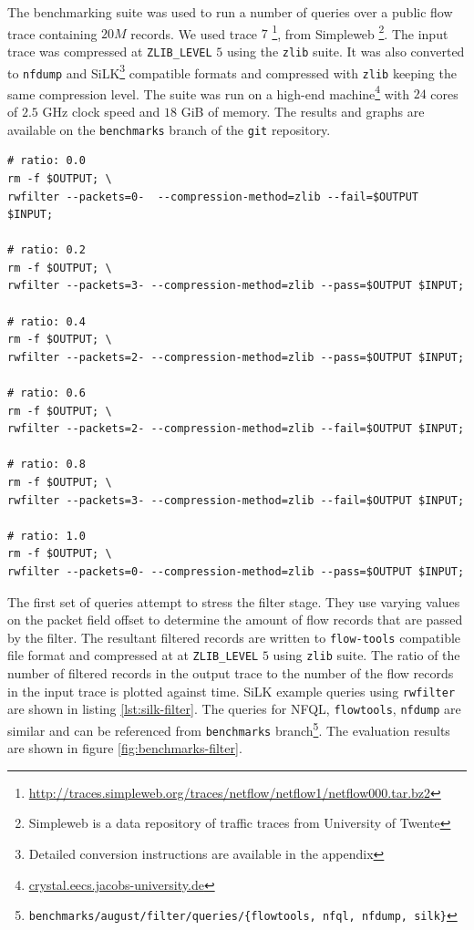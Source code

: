 The benchmarking suite was used to run a number of queries over a public flow
trace containing $20M$ records. We used trace $7$
\footnote{\url{http://traces.simpleweb.org/traces/netflow/netflow1/netflow000.tar.bz2}},
from Simpleweb \footnote{Simpleweb is a data repository of traffic traces from
University of Twente}.  The input trace was compressed at \texttt{ZLIB\_LEVEL}
$5$ using the \texttt{zlib} suite. It was also converted to \texttt{nfdump}
and SiLK\footnote{Detailed conversion instructions are available in the
appendix} \cite{SiLK} compatible formats and compressed with \texttt{zlib}
keeping the same compression level.  The suite was run on a high-end
machine\footnote{\url{crystal.eecs.jacobs-university.de}} with $24$ cores of
$2.5$ GHz clock speed and $18$ GiB of memory. The results and graphs are
available on the \texttt{benchmarks} branch of the \texttt{git} repository.

\begin{lstlisting}
# ratio: 0.0
rm -f $OUTPUT; \
rwfilter --packets=0-  --compression-method=zlib --fail=$OUTPUT $INPUT;

# ratio: 0.2
rm -f $OUTPUT; \
rwfilter --packets=3- --compression-method=zlib --pass=$OUTPUT $INPUT;

# ratio: 0.4
rm -f $OUTPUT; \
rwfilter --packets=2- --compression-method=zlib --pass=$OUTPUT $INPUT;

# ratio: 0.6
rm -f $OUTPUT; \
rwfilter --packets=2- --compression-method=zlib --fail=$OUTPUT $INPUT;

# ratio: 0.8
rm -f $OUTPUT; \
rwfilter --packets=3- --compression-method=zlib --fail=$OUTPUT $INPUT;

# ratio: 1.0
rm -f $OUTPUT; \
rwfilter --packets=0- --compression-method=zlib --pass=$OUTPUT $INPUT;
\end{lstlisting}

The first set of queries attempt to stress the filter stage.  They use varying
values on the packet field offset to determine the amount of flow records that
are passed by the filter. The resultant filtered records are written to
\texttt{flow-tools} compatible file format and compressed at  at
\texttt{ZLIB\_LEVEL} $5$  using \texttt{zlib}
suite. The ratio of the number of filtered records in the output trace to the
number of the flow records in the input trace is plotted against time. SiLK
example queries using \texttt{rwfilter} are shown in listing
\ref{lst:silk-filter}. The queries for \ac{NFQL}, \texttt{flowtools},
\texttt{nfdump} are similar and can be referenced from \texttt{benchmarks}
branch\footnote{\texttt{benchmarks/august/filter/queries/\{flowtools, nfql,
nfdump, silk\}}}. The evaluation results are shown in figure
\ref{fig:benchmarks-filter}.

